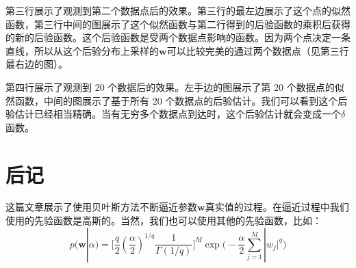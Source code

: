 \documentclass[10pt,a4paper,UTF8]{article}
\begin{document}
第三行展示了观测到第二个数据点后的效果。第三行的最左边展示了这个点的似然函数，第三行中间的图展示了这个似然函数与第二行得到的后验函数的乘积后获得的新的后验函数。这个后验函数是受两个数据点影响的函数。因为两个点决定一条直线，所以从这个后验分布上采样的\(\mathbf{w}\)可以比较完美的通过两个数据点（见第三行最右边的图）。

第四行展示了观测到 20 个数据后的效果。左手边的图展示了第 20 个数据点的似然函数，中间的图展示了基于所有 20 个数据点的后验估计。我们可以看到这个后验估计已经相当精确。当有无穷多个数据点到达时，这个后验估计就会变成一个\(\delta\)函数。
\section{后记}
\label{sec:orgb0b7982}


这篇文章展示了使用贝叶斯方法不断逼近参数\(\mathbf{w}\)真实值的过程。在逼近过程中我们使用的先验函数是高斯的。当然，我们也可以使用其他的先验函数，比如：
\begin{equation}
\label{eq:9}
p(\mathbf{w}|\alpha) = \bigg[ \frac{q}{2} (\frac{\alpha}{2})^{1/q} \frac{1}{\Gamma(1/q)} \bigg]^{M}\exp\bigg( -\frac{\alpha}{2}\sum_{j=1}^{M}|w_{j}|^{q} \bigg)
\end{equation}
\end{document}
